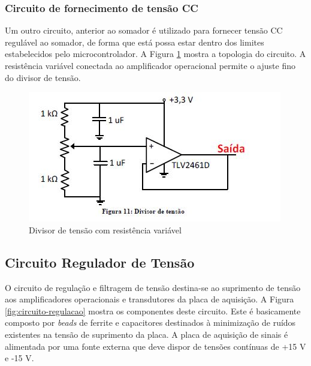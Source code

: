 \subsubsection{Circuito de fornecimento de tensão CC}

Um outro circuito, anterior ao somador é utilizado para fornecer tensão CC regulável ao somador, de forma que está possa estar dentro dos limites estabelecidos pelo microcontrolador. A Figura \ref{fig:divisor-tensao} mostra a topologia do circuito. A resistência variável conectada ao amplificador operacional permite o ajuste fino do divisor de tensão.

\begin{figure}[!hbt]
	\begin{center}
		\includegraphics[scale=0.7]{figuras/divisor-tensao.JPG}
		\caption{Divisor de tensão com resistência variável}
		\label{fig:divisor-tensao}
	\end{center}
\end{figure}

\subsection{Circuito Regulador de Tensão}

O circuito de regulação e filtragem de tensão destina-se ao suprimento de tensão aos amplificadores operacionais e transdutores da placa de aquisição. A Figura \ref{fig:circuito-regulacao} mostra os componentes deste circuito. Este é basicamente composto por \textit{beads} de ferrite e capacitores destinados à minimização de ruídos existentes na tensão de suprimento da placa. A placa de aquisição de sinais é alimentada por uma fonte externa que deve dispor de tensões contínuas de +15 V e -15 V.

